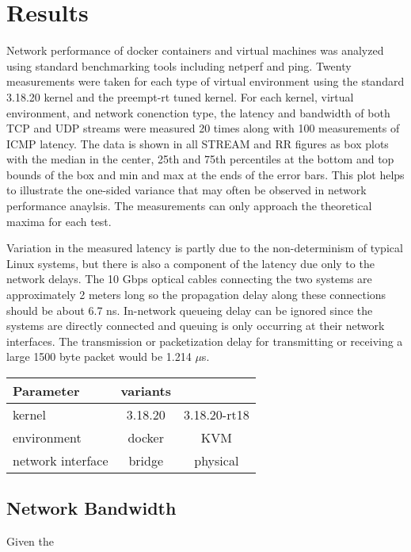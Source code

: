 \chapter{Results}
\label{cha:results}
\label{sec:results}
Network performance of docker containers and virtual machines was analyzed using standard benchmarking tools including netperf and ping.  
Twenty measurements were taken for each type of virtual environment using the standard 3.18.20 kernel and the preempt-rt tuned kernel.
For each kernel, virtual environment, and network conenction type, the latency and bandwidth of both TCP and UDP streams were measured 20 times along with 100 measurements of ICMP latency.
The data is shown in all STREAM and RR figures as box plots with the median in the center, 25th and 75th percentiles at the bottom and top bounds of the box and min and max at the ends of the error bars.
This plot helps to illustrate the one-sided variance that may often be observed in network performance anaylsis.  
The measurements can only approach the theoretical maxima for each test.  

Variation in the measured latency is partly due to the non-determinism of typical Linux systems, but there is also a component of the latency due only to the network delays.
The 10 Gbps optical cables connecting the two systems are approximately 2 meters long so the propagation delay along these connections should be about 6.7 ns.
In-network queueing delay can be ignored since the systems are directly connected and queuing is only occurring at their network interfaces.
The transmission or packetization delay for transmitting or receiving a large 1500 byte packet would be 1.214 $\mu$s.

\begin{table}[ht!]
    \centering
    \begin{tabular}{|l|c|c|}
    \hline
    Parameter & variants & \\
    \hline \hline
    kernel & 3.18.20 & 3.18.20-rt18 \\ 
    environment & docker & KVM \\ 
    network interface & bridge & physical \\ 
    \hline
    \end{tabular}
\end{table}

\section{Network Bandwidth} %
\label{sec:networkbandwidth}
Given the 

